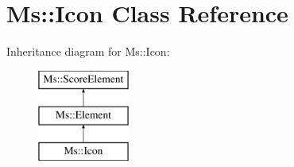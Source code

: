 \hypertarget{class_ms_1_1_icon}{}\section{Ms\+:\+:Icon Class Reference}
\label{class_ms_1_1_icon}
Inheritance diagram for Ms\+:\+:Icon\+:\begin{figure}[H]
\begin{center}
\leavevmode
\includegraphics[height=3.000000cm]{class_ms_1_1_icon}
\end{center}
\end{figure}
